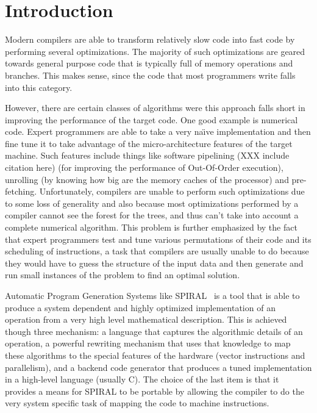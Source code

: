 \documentclass[12pt]{article}
\begin{document}
\maketitle

\section{Introduction}

Modern compilers are able to transform relatively slow code into fast code
by performing several optimizations. The majority of such optimizations
are geared towards general purpose code that is typically full of memory operations and
branches. This makes sense, since the code that most programmers write falls into this category.

However, there are certain classes of algorithms were this approach falls short in improving
the performance of the target code. One good example is numerical code. Expert programmers
are able to take a very na\"\i ve implementation and then fine tune it to take advantage of the
micro-architecture features of the target machine. Such features include things like software
pipelining (XXX include citation here) (for improving the performance of Out-Of-Order execution),
unrolling (by knowing how big are the memory caches of the processor) and pre-fetching.
Unfortunately, compilers are unable to perform such optimizations due
to some loss of generality and also because most optimizations performed by a compiler
cannot see the forest for the trees, and thus can't take into account a complete numerical algorithm.
This problem is further emphasized by the fact that expert programmers test and tune various permutations
of their code and its scheduling of instructions, a task that compilers are usually unable to do because
they would have to guess the structure of the input data and then generate and run small instances of the problem
to find an optimal solution.

Automatic Program Generation Systems like SPIRAL~\cite{Pueschel:05} is a tool that is able to produce a system
dependent and highly optimized implementation of an operation from a very high level mathematical description. 
This is achieved though three mechanism: a language that captures the algorithmic details of an operation, a powerful
rewriting mechanism that uses that knowledge to map these algorithms to the special features of the hardware (vector
instructions and parallelism), and a backend code generator that produces a tuned implementation in a high-level language
(usually C). The choice of the last item is that it provides a means for SPIRAL to be portable by allowing the compiler to do the very
system specific task of mapping the code to machine instructions.
\end{document}

